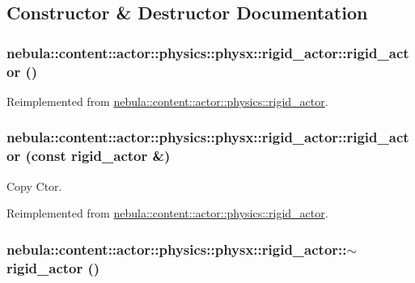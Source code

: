 \subsection{Constructor \& Destructor Documentation}
\hypertarget{classnebula_1_1content_1_1actor_1_1physics_1_1physx_1_1rigid__actor_ab178feb95b5515d4aacf05ec19e89918}{
\subsubsection[{rigid\_\-actor}]{\setlength{\rightskip}{0pt plus 5cm}nebula::content::actor::physics::physx::rigid\_\-actor::rigid\_\-actor ()}}
\label{classnebula_1_1content_1_1actor_1_1physics_1_1physx_1_1rigid__actor_ab178feb95b5515d4aacf05ec19e89918}


Reimplemented from \hyperlink{classnebula_1_1content_1_1actor_1_1physics_1_1rigid__actor_a4f2e973415743c709748988cae08fae4}{nebula::content::actor::physics::rigid\_\-actor}.\hypertarget{classnebula_1_1content_1_1actor_1_1physics_1_1physx_1_1rigid__actor_aa2f8aa3c353d8c2ed22e02884cc1df2a}{
\subsubsection[{rigid\_\-actor}]{\setlength{\rightskip}{0pt plus 5cm}nebula::content::actor::physics::physx::rigid\_\-actor::rigid\_\-actor (const {\bf rigid\_\-actor} \&)}}
\label{classnebula_1_1content_1_1actor_1_1physics_1_1physx_1_1rigid__actor_aa2f8aa3c353d8c2ed22e02884cc1df2a}


Copy Ctor. 

Reimplemented from \hyperlink{classnebula_1_1content_1_1actor_1_1physics_1_1rigid__actor_adac3d7fa9f651e09f453e7af0fb5f6f1}{nebula::content::actor::physics::rigid\_\-actor}.\hypertarget{classnebula_1_1content_1_1actor_1_1physics_1_1physx_1_1rigid__actor_a29f3ac242b4c5b45ce8c40233ba89990}{
\subsubsection[{$\sim$rigid\_\-actor}]{\setlength{\rightskip}{0pt plus 5cm}nebula::content::actor::physics::physx::rigid\_\-actor::$\sim$rigid\_\-actor ()}}
\label{classnebula_1_1content_1_1actor_1_1physics_1_1physx_1_1rigid__actor_a29f3ac242b4c5b45ce8c40233ba89990}


